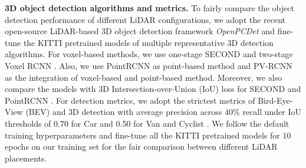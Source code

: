\documentclass[10pt,twocolumn,letterpaper]{article}
\begin{document}
\textbf{3D object detection algorithms and metrics.} To fairly compare the object detection performance of different LiDAR configurations, we adopt the recent open-source LiDAR-based 3D object detection framework \textit{OpenPCDet} \cite{openpcdet2020} and fine-tune the KITTI pretrained models of multiple representative 3D detection algorithms. For voxel-based methods, we use one-stage SECOND \cite{yan2018second} and two-stage Voxel RCNN  \cite{deng2020voxel}. Also, we use PointRCNN \cite{Shi_2019_CVPR} as point-based method and PV-RCNN  \cite{shi2020pv} as the integration of voxel-based and point-based method. Moreover, we also compare the models with 3D Intersection-over-Union (IoU) loss for SECOND \cite{yan2018second} and PointRCNN \cite{Shi_2019_CVPR}.
For detection metrics, we adopt the strictest metrics of Bird-Eye-View (BEV) and 3D detection with average precision across 40\% recall under IoU thresholds of 0.70 for Car and 0.50 for Van and Cyclist \cite{geiger2013vision, openpcdet2020}.
We follow the default training hyperparameters and fine-tune  all the KITTI pretrained models for 10 epochs on our training set for the fair comparison between different LiDAR placements.
\end{document}
